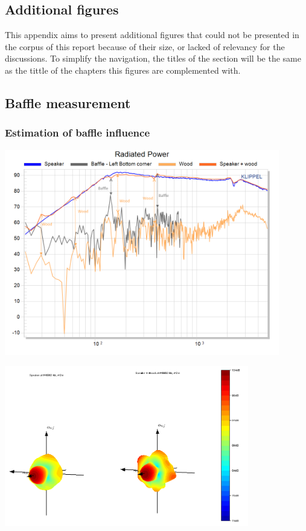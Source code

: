 \documentclass{report}
\begin{document}
\begin{appendices}
\chapter{Additional figures}
This appendix aims to present additional figures that could not be presented in the corpus of this report because of their size, or lacked of relevancy for the discussions. To simplify the navigation, the titles of the section will be the same as the tittle of the chapters this figures are complemented with. 


\section{Baffle measurement}
\subsection{Estimation of baffle influence}
\label{Curves:BaffleInfluence}

\begin{center}
	\includegraphics[width=0.9\textwidth]{Appendix/Vib_RadPow}
    \captionsetup{hypcap=false}
    \label{Curves:Baffle_RadPow}
\end{center}

\begin{center}
	\includegraphics[width=0.8\textwidth]{Appendix/compa_baffle_Vib_Balloon}
    \captionsetup{hypcap=false}
    \label{Curves:Baffle_BalloonComp}
\end{center}


\end{appendices}
\end{document}
